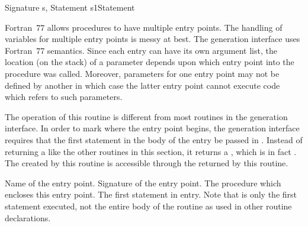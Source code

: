 	{Signature s, Statement s1}{Statement}
\begin{functionality}
Fortran~77 allows procedures to have multiple entry points.  The
handling of variables for multiple entry points is messy at best.  The
generation interface uses Fortran~77 semantics.  Since each entry can
have its own argument list, the location (on the stack) of a parameter
depends upon which entry point into the procedure was called.
Moreover, parameters for one entry point may not be defined by another
in which case the latter entry point cannot execute code which refers
to such parameters.

The operation of this routine is different from most routines in the
generation interface.  In order to mark where the entry point begins,
the generation interface requires that the first statement in the body
of the entry be passed in .  Instead of returning a 
 like the other routines in this section, it returns
a , which is in fact .  The  
created by this routine is accessible through the  
returned by this routine.
\begin{Parameters}
 Name of the entry point.
 Signature of the entry point.
 The procedure which encloses this entry
point. 
 The first statement in entry.  Note that  is 
only the first statement executed, not the entire body of the routine
as used in other routine declarations.
\end{Parameters}
\end{functionality}









